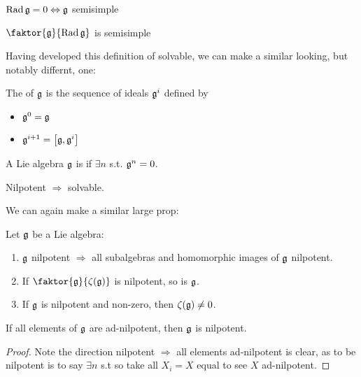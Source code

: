 \documentclass{article}
\begin{document}
\begin{prop}
	$\Rad \mf{g} =0 \Leftrightarrow  \mf{g}$ semisimple 
\end{prop}

\begin{prop}
	$\faktor{\mf{g}}{\Rad\mf{g}}$ is semisimple 
\end{prop}

Having developed this definition of solvable, we can make a similar looking, but notably differnt, one:

\begin{definition}
	The  of $\mf{g}$ is the sequence of ideals $\mf{g}^{i}$ defined by 
\begin{itemize}
	\item $\mf{g}^{0} = \mf{g}$
	\item $\mf{g}^{i+1} = \comm[\mf{g}]{\mf{g}^{i}}$
\end{itemize} 
\end{definition}

\begin{definition}
	A Lie algebra $\mf{g}$ is  if $\exists n$ s.t. $\mf{g}^{n}=0$. 
\end{definition}

\begin{prop}
	Nilpotent $\Rightarrow$ solvable.
\end{prop}

We can again make a similar large prop:

\begin{prop}
		Let $\mf{g}$ be a Lie algebra:
	\begin{enumerate}
		\item $\mf{g}$ nilpotent $\Rightarrow$ all subalgebras and homomorphic images of $\mf{g}$ nilpotent.
		\item If $\faktor{\mf{g}}{\zeta(\mf{g})}$ is nilpotent, so is $\mf{g}$. 
		\item If $\mf{g}$ is nilpotent and non-zero, then $\zeta(\mf{g}) \neq 0$. 
	\end{enumerate}
\end{prop}

\begin{theorem}[Engel]
	If all elements of $\mf{g}$ are ad-nilpotent, then $\mf{g}$ is nilpotent.
\end{theorem}
\begin{proof}
	Note the direction nilpotent $\Rightarrow$ all elements ad-nilpotent is clear, as to be nilpotent is to say $\exists n$ s.t 
so take all $X_i=X$ equal to see $X$ ad-nilpotent.  
\end{proof}
\end{document}
